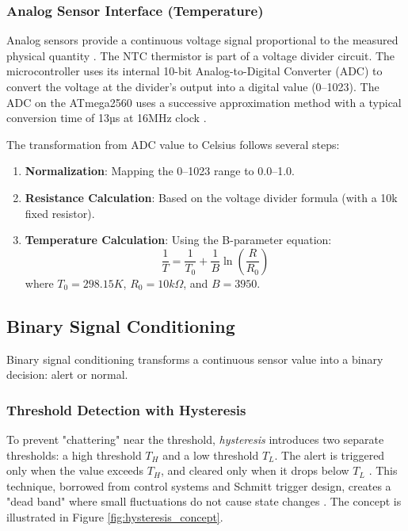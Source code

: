 \subsubsection{Analog Sensor Interface (Temperature)}
Analog sensors provide a continuous voltage signal proportional to the measured physical quantity \cite{sensor_interfaces}. The NTC thermistor is part of a voltage divider circuit. The microcontroller uses its internal 10-bit Analog-to-Digital Converter (ADC) to convert the voltage at the divider's output into a digital value (0--1023). The ADC on the ATmega2560 uses a successive approximation method with a typical conversion time of 13µs at 16MHz clock \cite{atmega2560_datasheet}.

The transformation from ADC value to Celsius follows several steps:
\begin{enumerate}
    \item \textbf{Normalization}: Mapping the 0--1023 range to 0.0--1.0.
    \item \textbf{Resistance Calculation}: Based on the voltage divider formula (with a 10k fixed resistor).
    \item \textbf{Temperature Calculation}: Using the B-parameter equation:
    \begin{equation}
    \frac{1}{T} = \frac{1}{T_0} + \frac{1}{B} \ln\left(\frac{R}{R_0}\right)
    \end{equation}
    where $T_0 = 298.15K$, $R_0 = 10k\Omega$, and $B = 3950$.
\end{enumerate}

\subsection{Binary Signal Conditioning}

Binary signal conditioning transforms a continuous sensor value into a binary decision: alert or normal.

\subsubsection{Threshold Detection with Hysteresis}
To prevent "chattering" near the threshold, \textit{hysteresis} introduces two separate thresholds: a high threshold $T_H$ and a low threshold $T_L$. The alert is triggered only when the value exceeds $T_H$, and cleared only when it drops below $T_L$ \cite{hysteresis_theory}. This technique, borrowed from control systems and Schmitt trigger design, creates a "dead band" where small fluctuations do not cause state changes \cite{schmitt_trigger}. The concept is illustrated in Figure \ref{fig:hysteresis_concept}.

